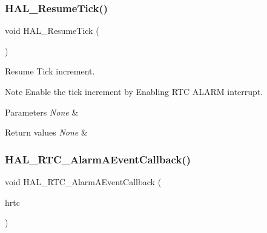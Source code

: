 \subsubsection{\texorpdfstring{H\+A\+L\+\_\+\+Resume\+Tick()}{HAL\_ResumeTick()}}
{\footnotesize\ttfamily void H\+A\+L\+\_\+\+Resume\+Tick (\begin{DoxyParamCaption}\item[{void}]{ }\end{DoxyParamCaption})}



Resume Tick increment. 

\begin{DoxyNote}{Note}
Enable the tick increment by Enabling R\+TC A\+L\+A\+RM interrupt. 
\end{DoxyNote}

\begin{DoxyParams}{Parameters}
{\em None} & \\
\hline
\end{DoxyParams}

\begin{DoxyRetVals}{Return values}
{\em None} & \\
\hline
\end{DoxyRetVals}
\mbox{\label{group___h_a_l___time_base___r_t_c___alarm___template_ga11aeff83fd498cddbed3bcddcf017e0a}} 
\subsubsection{\texorpdfstring{H\+A\+L\+\_\+\+R\+T\+C\+\_\+\+Alarm\+A\+Event\+Callback()}{HAL\_RTC\_AlarmAEventCallback()}}
{\footnotesize\ttfamily void H\+A\+L\+\_\+\+R\+T\+C\+\_\+\+Alarm\+A\+Event\+Callback (\begin{DoxyParamCaption}\item[{\hyperlink{struct_r_t_c___handle_type_def}{R\+T\+C\+\_\+\+Handle\+Type\+Def} $\ast$}]{hrtc }\end{DoxyParamCaption})}



